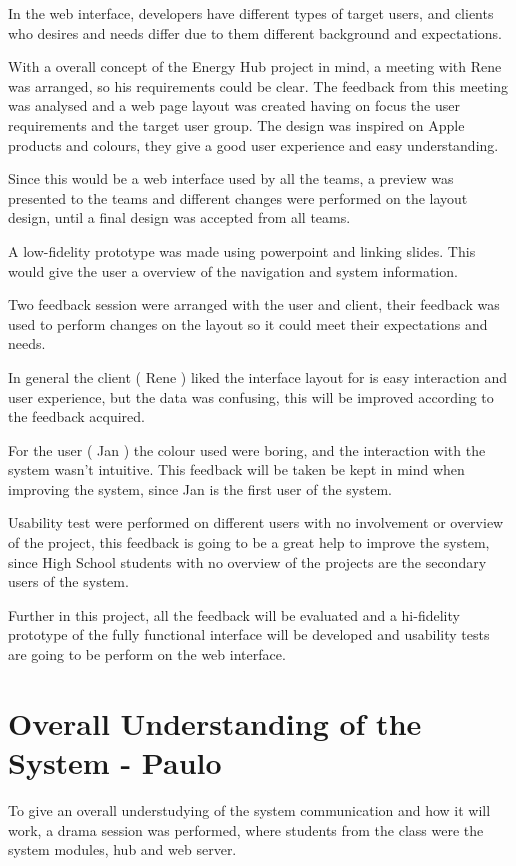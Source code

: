 In the web interface, developers have different types of target users, and clients who desires and needs differ due to them different background and expectations. 

With a overall concept of the Energy Hub project in mind, a meeting with Rene was arranged, so his requirements could be clear. The feedback from this meeting was analysed and a web page layout was created having on focus the user requirements and the target user group. The design was inspired on Apple products and colours, they give a good user experience and easy understanding.

Since this would be a web interface used by all the teams, a preview was presented to the teams and different changes were performed on the layout design, until a final design was accepted from all teams. 

A low-fidelity prototype was made using powerpoint and linking slides. This would give the user a overview of the navigation and system information.

Two feedback session were arranged with the user and client, their feedback was used to perform changes on the layout so it could meet their expectations and needs.

In general the client ( Rene ) liked the interface layout for is easy interaction and user experience, but the data was confusing, this will be improved according to the feedback acquired.

For the user ( Jan ) the colour used were boring, and the interaction with the system wasn't intuitive. This feedback will be taken be kept in mind when improving the system, since Jan is the first user of the system.

Usability test were performed on different users with no involvement or overview of the project, this feedback is going to be a great help to improve the system, since High School students with no overview of the projects are the secondary users of the system.

Further in this project, all the feedback will be evaluated and a hi-fidelity prototype of the fully functional interface will be developed and usability tests are going to be perform on the web interface.

\section{Overall Understanding of the System - Paulo} 

To give an overall understudying of the system communication and how it will work, a drama session was performed, where students from the class were the system modules, hub and web server.

